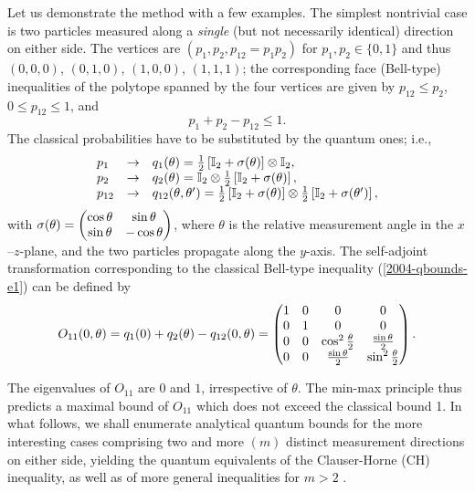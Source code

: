 \documentclass[prl,showpacs,showkeys,amsfonts,amsmath,twocolumn]{revtex4}
\begin{document}
Let us demonstrate the method with a few examples.
The simplest nontrivial case is two particles measured along a {\em single}
(but not necessarily identical) direction on either side.
The vertices are $(p_1,p_2,p_{12}=p_1p_2)$ for $p_1, p_2 \in \{0,1\}$ and thus
$(0,  0,  0)$,
$(0,  1,  0)$,
$(1,  0,  0)$,
$(1,  1,  1)$;
the corresponding face (Bell-type) inequalities of the polytope spanned by the four vertices
are given by
$p_{12} \le p_2$,
$0\le p_{12}\le 1$, and
\begin{equation}
p_1+p_2-p_{12}\le 1.
\label{2004-qbounds-e1}
\end{equation}
The classical probabilities have to be substituted by the quantum ones;
i.e.,
\begin{equation}
\begin{array}{lll}
p_1 &\rightarrow& q_1 (\theta ) =
{\frac{1}{2}}\left[{\mathbb I}_2 + {\bf \sigma}( \theta )\right] \otimes  {\mathbb I}_2,
\\
p_2 &\rightarrow& q_2 (\theta ) =
{\mathbb I}_2 \otimes {\frac{1}{2}}\left[{\mathbb I}_2 + {\bf \sigma}( \theta )\right],
\\
p_{12}&\rightarrow& q_{12} (\theta ,\theta ') =
{\frac{1}{2}}\left[{\mathbb I}_2 + {\bf \sigma}( \theta )\right]
\otimes
{\frac{1}{2}}\left[{\mathbb I}_2 + {\bf \sigma}( \theta ')\right],
\end{array}
\label{2004-qbounds-e2}
\end{equation}
with
$
{\bf \sigma}( \theta )=
\begin{pmatrix} \cos \theta & \sin \theta  \\
  \sin\theta & -\cos \theta
  \end{pmatrix}
$,
where $\theta $ is the relative measurement angle in the $x$--$z$-plane, and the two particles propagate along the $y$-axis.
The self-adjoint transformation corresponding to the classical Bell-type inequality
(\ref{2004-qbounds-e1}) can be defined by
\begin{equation}
O_{11}(0,\theta) = q_1(0)+q_2(\theta)-q_{12} (0, \theta )
=
\begin{pmatrix}
   1 & 0 & 0 & 0 \cr 0 & 1 & 0 & 0 \cr 0 & 0 & {\cos^2
     \frac{\theta }{2}} & \frac{\sin \theta }
   {2} \cr 0 & 0 & \frac{\sin \theta }{2} & {\sin^2  \frac{\theta
     }{2}} \cr
 \end{pmatrix}.
\end{equation}

The eigenvalues of $O_{11}$ are $0$ and $1$, irrespective of $\theta$.
The min-max principle thus predicts a maximal bound of $O_{11}$
which does not exceed the classical bound 1.
In what follows, we shall enumerate analytical quantum bounds
for the more interesting cases comprising two and more $(m)$ distinct measurement directions on either
side, yielding the quantum equivalents of the
Clauser-Horne (CH) inequality, as well as of more general inequalities
 for $m > 2$ \cite{2000-poly,collins-gisin-2003,sliwa-2003}.
\end{document}
